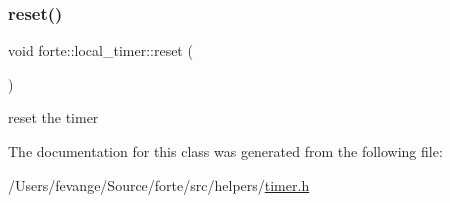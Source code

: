 \subsubsection{\texorpdfstring{reset()}{reset()}}
{\footnotesize\ttfamily void forte\+::local\+\_\+timer\+::reset (\begin{DoxyParamCaption}{ }\end{DoxyParamCaption})\hspace{0.3cm}{\ttfamily [inline]}}



reset the timer 



The documentation for this class was generated from the following file\+:\begin{DoxyCompactItemize}
\item 
/\+Users/fevange/\+Source/forte/src/helpers/\mbox{\hyperlink{timer_8h}{timer.\+h}}\end{DoxyCompactItemize}
